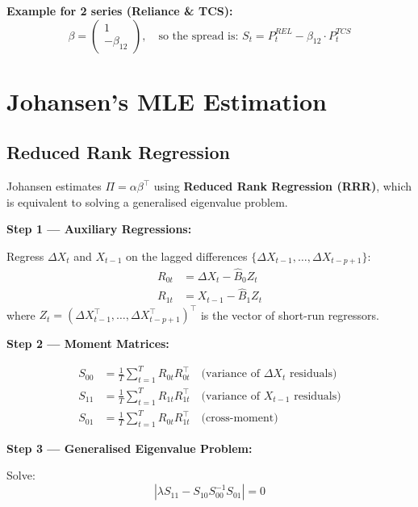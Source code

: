 \documentclass[12pt, a4paper]{article}
\begin{document}
\textbf{Example for 2 series (Reliance \& TCS):}
\[
\beta = \begin{pmatrix} 1 \\ -\beta_{12} \end{pmatrix}, \quad
\text{so the spread is: } S_t = P^{REL}_t - \beta_{12} \cdot P^{TCS}_t
\]

\section{Johansen's MLE Estimation}

\subsection{Reduced Rank Regression}

Johansen estimates $\Pi = \alpha\beta^\top$ using \textbf{Reduced Rank Regression (RRR)}, 
which is equivalent to solving a generalised eigenvalue problem.

\textbf{Step 1 — Auxiliary Regressions:}

Regress $\Delta X_t$ and $X_{t-1}$ on the lagged differences $\{\Delta X_{t-1}, \ldots, \Delta X_{t-p+1}\}$:
\begin{align}
    R_{0t} &= \Delta X_t - \hat{B}_0 Z_t \\
    R_{1t} &= X_{t-1} - \hat{B}_1 Z_t
\end{align}
where $Z_t = (\Delta X_{t-1}^\top, \ldots, \Delta X_{t-p+1}^\top)^\top$ is the vector of short-run regressors.

\textbf{Step 2 — Moment Matrices:}

\begin{align}
    S_{00} &= \frac{1}{T} \sum_{t=1}^T R_{0t} R_{0t}^\top \quad \text{(variance of } \Delta X_t \text{ residuals)} \\
    S_{11} &= \frac{1}{T} \sum_{t=1}^T R_{1t} R_{1t}^\top \quad \text{(variance of } X_{t-1} \text{ residuals)} \\
    S_{01} &= \frac{1}{T} \sum_{t=1}^T R_{0t} R_{1t}^\top \quad \text{(cross-moment)}
\end{align}

\textbf{Step 3 — Generalised Eigenvalue Problem:}

Solve:
\begin{equation}
    \boxed{ \left| \lambda S_{11} - S_{10} S_{00}^{-1} S_{01} \right| = 0 }
    \label{eq:eigproblem}
\end{equation}
\end{document}
